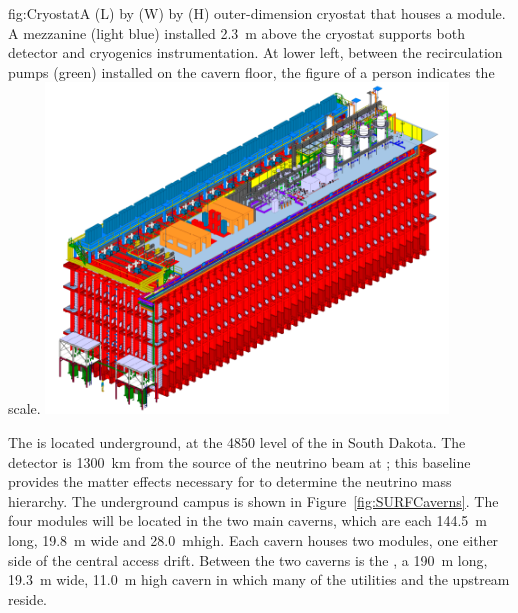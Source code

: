 \begin{dunefigure}{fig:Cryostat}{A  \cryostatlen (L) by \cryostatwdth (W) by \cryostatht{} (H) outer-dimension cryostat that houses a \nominalmodsize {} module. A mezzanine (light blue) installed \SI{2.3}{m} above the cryostat supports both  detector and cryogenics instrumentation. At lower left, between the \lar recirculation pumps (green) installed on the cavern floor,  the figure of a person indicates the scale.}
\includegraphics[width=0.8\textwidth]{graphics/cryostat-scale.png}
\end{dunefigure}


The  is located underground, at the \SI{4850}{\foot} level of the  in South Dakota. The detector is \SI{1300}{\km} from the source of the  neutrino beam at ; this baseline provides the matter effects necessary for  to determine the neutrino mass hierarchy. The  underground campus is shown in Figure~\ref{fig:SURFCaverns}. The four \nominalmodsize {} modules will be located in the two main caverns, which are each \SI{144.5}{\meter} long, \SI{19.8}{\meter} wide and %
\SI{28.0}{\meter}high. Each cavern houses two \nominalmodsize modules, one either side of the central access drift. Between the two caverns is the , a \SI{190}{\meter} long, \SI{19.3}{\meter} wide, %
\SI{11.0}{\meter} high cavern in which many of the utilities and the upstream  reside.

